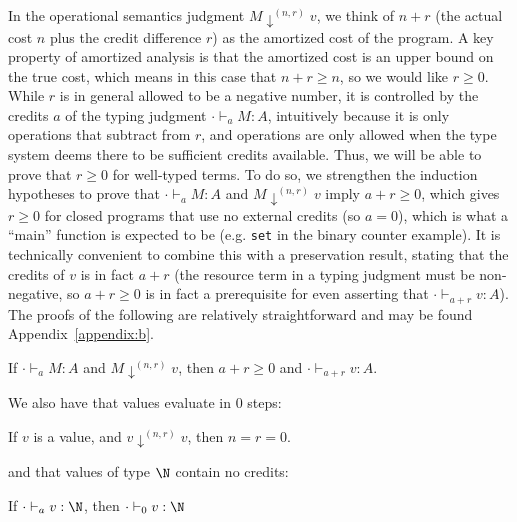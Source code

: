 In the operational semantics judgment $M \downarrow^{(n,r)} v$, we
think of $n + r$ (the actual cost $n$ plus the credit difference $r$) as
the amortized cost of the program.  A key property of amortized analysis
is that the amortized cost is an upper bound on the true cost, which
means in this case that $n + r \ge n$, so we would like $r \ge 0$.
While $r$ is in general allowed to be a negative number, it is
controlled by the credits $a$ of the typing judgment $\cdot \vdash_a M
: A$, intuitively because it is only \discname\/ operations that
subtract from $r$, and \discname\/ operations are only allowed when the
type system deems there to be sufficient credits available.  Thus, we
will be able to prove that $r \ge 0$ for well-typed terms.  To do so,
we strengthen the induction hypotheses to prove that $\cdot \vdash_a M :
A$ and $M \downarrow^{(n,r)} v$ imply $a + r \geq 0$, which gives $r
\geq 0$ for closed programs that use no external credits (so $a = 0$),
which is what a ``main'' function is expected to be (e.g. \texttt{set}
in the binary counter example).  It is technically convenient to combine
this with a preservation result, stating that the credits of $v$ is in
fact $a + r$ (the resource term in a typing judgment must be
non-negative, so $a + r \geq 0$ is in fact a prerequisite for even
asserting that $\cdot \vdash_{a+r} v : A$).  The proofs of the following are
relatively straightforward and may be found
Appendix~\ref{appendix:b}.%


\begin{theorem}
\label{thm:pres}
If $\cdot \vdash_a M : A$ and $M \downarrow^{(n,r)} v$, then $a + r \geq 0$ and $\cdot \vdash_{a + r} v : A$. 
\end{theorem}

We also have that values evaluate in 0 steps:
\begin{theorem}\label{thm:val-eval-none}
If $v$ is a value, and $v \downarrow^{(n,r)} v$, then $n = r = 0$.
\end{theorem}

and that values of type $\N$ contain no credits:
\begin{theorem}\label{thm:nat-strengthening}
If $\cdot \vdash_a v : \N$, then $\cdot \vdash_0 v : \N$
\end{theorem}



